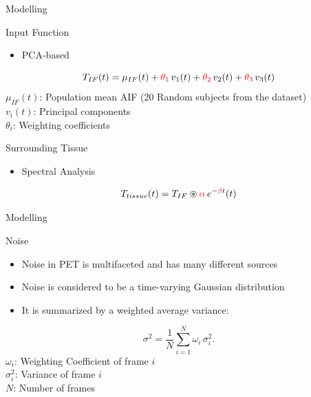 \documentclass[aspectratio=169]{beamer}
\begin{document}
\begin{frame}{Modelling}
	\small
	\begin{block}{Input Function}
		\begin{itemize}
			\item PCA-based
		\end{itemize}

		\[
			T_{IF}(t) = \mu_{IF}(t) +  \textcolor{red}{\theta_1}\,v_1(t) +  \textcolor{red}{\theta_2}\,v_2(t) +  \textcolor{red}{\theta_3}\,v_3(t)
		\]
		\(\mu_{IF}(t)\): Population mean AIF (20 Random subjects from the dataset)\\
		\(v_{i}(t)\): Principal components \\
		\(\theta_{i}\): Weighting coefficients
	\end{block}
	\begin{block}{Surrounding Tissue}
		\begin{itemize}
			\item Spectral Analysis
		\end{itemize}
		\[
			T_{tissue}(t) = T_{IF} \circledast \textcolor{red}{\alpha}\,e^{-\textcolor{red}{\beta}t} (t)
		\]
	\end{block}
\end{frame}

\begin{frame}{Modelling}
	\begin{block}{Noise}
		\begin{itemize}
			\setlength\itemsep{1em}
			\item Noise in PET is multifaceted and has many different sources
			\item Noise is considered to be a time-varying Gaussian distribution
			\item It is summarized by a weighted average variance:
		\end{itemize}
		\[
			\sigma^2 = \frac{1}{N} \sum_{i=1}^{N} \omega_i\,\sigma_i^2.
		\]
		\(\omega_i\): Weighting Coefficient of frame $i$\\
		\(\sigma_i^2\): Variance of frame $i$\\
		$N$: Number of frames
		\vspace{6em}
	\end{block}
\end{frame}
\end{document}
